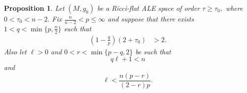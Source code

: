 \documentclass[12pt]{amsart}
\newcommand{\LB}{\left[}
\newcommand{\RB}{\right]}
\renewcommand{\1}{{\mathbf 1}}
\newtheorem{prop}[thm]{Proposition}
\theoremstyle{others}
\numberwithin{equation}{section}
\begin{document}
\begin{prop}\label{prop:Lpbootstrap} %
Let $(M, g_0)$ be a Ricci-flat ALE space of order $\tau \geq \tau_0,$ where $0 < \tau_0 < n-2.$ Fix $\frac{n}{n-2} < p \leq \infty$ and suppose that there exists $1 < q < \min\{p, \frac{n}{2} \}$ such that
\begin{equation}\label{Lpbootstrap:tauassumptions}
\begin{split}
\left( 1 - \frac{q}{p} \right)\left(2 + \tau_0 \right) & > 2.
\end{split}
\end{equation}
Also let $\ell > 0$ and $0 < r < \min \{p-q, 2\}$ be such that 
\begin{equation}\label{qlplusonelessthann}
q \ell + 1 < n
\end{equation}
and
\begin{equation}\label{2-relllessthan...}
\ell < \frac{n(p-r)}{(2 - r) p}.
\end{equation}




\end{prop}
\end{document}

